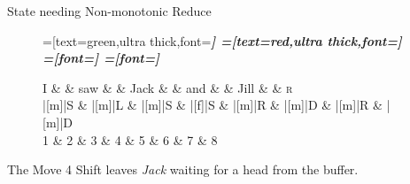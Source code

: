 \documentclass{lecture}
\begin{document}
\begin{plain}{State needing Non-monotonic Reduce}
\begin{figure}
    \centering
    \begin{dependency}[theme=simple]
    =[text=green,ultra thick,font=\bfseries\itshape]
    =[text=red,ultra thick,font=\bfseries\itshape]
    =[font=\bfseries\itshape]
    =[font=\itshape]
    \begin{deptext}[column sep=.075cm, row sep=.1ex]
        I \&           \& saw \&          \& Jack       \& \& and     \&           \& Jill \&   \& \textsc{r} \\
       |[m]|S \& |[m]|L \& |[m]|S   \& |[f]|S \& |[m]|R \& |[m]|D \& |[m]|R \& |[m]|D  \\
1 \&     2       \& 3  \&   4      \& 5          \& 6 \& 7     \& 8 \\
\end{deptext}
    
\end{dependency}
\end{figure}
The Move 4 Shift leaves \emph{Jack} waiting for a head from the buffer.
\end{plain}
\end{document}

